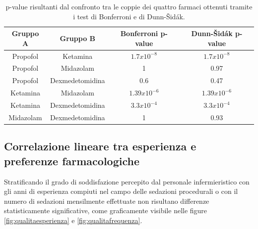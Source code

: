 \bgroup
\def\arraystretch{1.5}
\begin{table}[h]
    \centering
    \begin{tabular}{c|c|c|c}
         Gruppo A & Gruppo B & Bonferroni p-value & Dunn-Šidák p-value\\ \hline
       Propofol & Ketamina & $1.7x10^{-8}$ & $1.7x10^{-8}$ \\
       Propofol & Midazolam  & 1 & 0.97\\
       Propofol & Dexmedetomidina & 0.6 & 0.47\\
       Ketamina & Midazolam & $1.39x10^{-6}$ & $1.39x10^{-6}$\\
       Ketamina & Dexmedetomidina & $3.3x10^{-4}$ & $3.3x10^{-4}$\\
       Midazolam & Dexmedetomidina & 1 & 0.93\\
       
    \end{tabular}
    \caption{p-value risultanti dal confronto tra le coppie dei quattro farmaci ottenuti tramite i test di Bonferroni e di Dunn-Šidák.}
    \label{tab:qualitatest}
\end{table}
\egroup

\newpage
\subsection*{Correlazione lineare tra esperienza e preferenze farmacologiche}

Stratificando il grado di soddisfazione percepito dal personale infermieristico con gli anni di esperienza compiuti nel campo delle sedazioni procedurali o con il numero di sedazioni mensilmente effettuate non risultano differenze statisticamente significative, come graficamente visibile nelle figure \ref{fig:qualitaesperienza} e \ref {fig:qualitafrequenza}.

